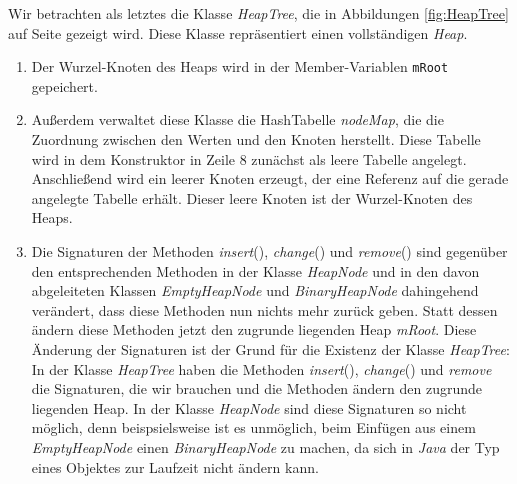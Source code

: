 Wir betrachten als letztes die
Klasse \textsl{HeapTree}, die in Abbildungen \ref{fig:HeapTree} auf Seite
\pageref{fig:HeapTree} gezeigt wird.  Diese Klasse repr\"asentiert einen vollst\"andigen
\textsl{Heap}.  
\begin{enumerate}
\item Der Wurzel-Knoten  des Heaps wird in der Member-Variablen \texttt{mRoot}
      gepeichert. 
\item Au{\ss}erdem verwaltet diese Klasse die HashTabelle \textsl{nodeMap}, die
      die Zuordnung zwischen den Werten und den Knoten herstellt.  Diese Tabelle
      wird in dem Konstruktor in Zeile 8 zun\"achst als leere Tabelle angelegt.
      Anschlie{\ss}end wird ein leerer Knoten erzeugt, der eine Referenz auf die
      gerade angelegte Tabelle erh\"alt.  Dieser leere Knoten ist der Wurzel-Knoten
      des Heaps.
\item Die Signaturen der Methoden \textsl{insert}(), \textsl{change}() und
      \textsl{remove}() sind gegen\"uber den entsprechenden Methoden in der Klasse
      \textsl{HeapNode} und in den davon abgeleiteten Klassen
      \textsl{EmptyHeapNode} und \textsl{BinaryHeapNode} dahingehend ver\"andert,
      dass diese Methoden nun nichts mehr zur\"uck geben. Statt dessen \"andern
      diese Methoden jetzt den zugrunde liegenden Heap \textsl{mRoot}.  Diese
      \"Anderung der Signaturen ist der Grund f\"ur die Existenz der Klasse
      \textsl{HeapTree}: In der Klasse \textsl{HeapTree} haben die Methoden
      \textsl{insert}(), \textsl{change}() und \textsl{remove} die Signaturen,
      die wir brauchen und die Methoden \"andern den zugrunde liegenden Heap.  
      In der Klasse \textsl{HeapNode} sind diese Signaturen so nicht m\"oglich,
      denn beispsielsweise ist es unm\"oglich, beim Einf\"ugen aus einem
      \textsl{EmptyHeapNode} einen \textsl{BinaryHeapNode} zu machen, da sich in
      \textsl{Java} der Typ eines Objektes zur Laufzeit nicht \"andern kann.
\end{enumerate}

